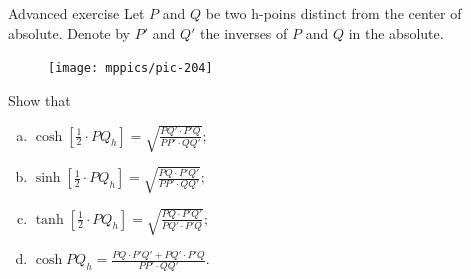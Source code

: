 \begin{thm}{Advanced exercise}\label{ex:cosh}
Let $P$ and $Q$ be two h-poins distinct from the center of absolute.
Denote by $P'$ and $Q'$ the inverses of $P$ and $Q$ in the absolute.

\begin{figure}
\centering
\texttt{[image: mppics/pic-204]}
\end{figure}

Show that 
\medskip
\begin{enumerate}[(a)]
\item\label{ex:cosh/2} 
$\displaystyle{\cosh[\tfrac12\cdot PQ_h]=\sqrt{\frac{PQ'\cdot P'Q}{PP'\cdot QQ'}};}$
\medskip
\item\label{ex:coshsinh} 
$\displaystyle{\sinh[\tfrac12\cdot PQ_h]=\sqrt{\frac{PQ\cdot P'Q'}{PP'\cdot QQ'}};}$
\medskip
\item\label{ex:coshtanh} 
$\displaystyle{\tanh[\tfrac12\cdot PQ_h]=\sqrt{\frac{PQ\cdot P'Q'}{PQ'\cdot P'Q}};}$
\medskip
\item\label{ex:coshcosh} 
$\displaystyle{\cosh PQ_h=\frac{PQ\cdot P'Q'+PQ'\cdot P'Q}{PP'\cdot QQ'}.}$
\end{enumerate}

\end{thm}


